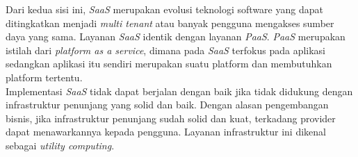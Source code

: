 \tab Dari kedua sisi ini, \textit{SaaS} merupakan evolusi teknologi software yang dapat ditingkatkan menjadi \textit{multi tenant} atau banyak pengguna mengakses sumber daya yang sama. Layanan \textit{SaaS} identik dengan layanan \textit{PaaS}. \textit{PaaS} merupakan istilah dari \textit{platform as a service}, dimana pada \textit{SaaS} terfokus pada aplikasi sedangkan aplikasi itu sendiri merupakan suatu platform dan membutuhkan platform tertentu.\\
\tab Implementasi \textit{SaaS} tidak dapat berjalan dengan baik jika tidak didukung dengan infrastruktur penunjang yang solid dan baik. Dengan alasan pengembangan bisnis, jika infrastruktur penunjang sudah solid dan kuat, terkadang provider dapat menawarkannya kepada pengguna. Layanan infrastruktur ini dikenal sebagai \textit{utility computing}.\\

